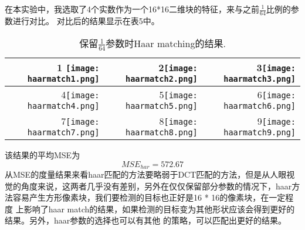 \documentclass{ctexart}
\begin{document}
在本实验中，我选取了4个实数作为一个16*16二维块的特征，来与之前$\frac{1}{64}$比例的参数进行对比。
对比后的结果显示在表5中。
\begin{table}
\Large 
\begin{tabular}{|r|r|r|}
\hline

1 \texttt{[image: haarmatch1.png]} & 2\texttt{[image: haarmatch2.png]} & 3\texttt{[image: haarmatch3.png]} \\ \hline

4\texttt{[image: haarmatch4.png]} & 5\texttt{[image: haarmatch5.png]} & 6\texttt{[image: haarmatch6.png]} \\ \hline

7\texttt{[image: haarmatch7.png]} & 8\texttt{[image: haarmatch8.png]} & 9\texttt{[image: haarmatch9.png]} \\ \hline

\end{tabular}
\caption{保留$\frac{1}{64}$参数时Haar matching的结果.}
\end{table}
该结果的平均MSE为
\begin{equation}
MSE_{har} = 572.67
\end{equation}
从MSE的度量结果来看haar匹配的方法要略弱于DCT匹配的方法，但是从人眼视觉的角度来说，这两者几乎没有差别，另外在仅仅保留部分参数的情况下，haar方法容易产生方形像素块，我们要检测的目标也正好是16 * 16的像素块，在一定程度
上影响了haar match的结果，如果检测的目标变为其他形状应该会得到更好的结果。另外，haar参数的选择也可以有其他
的策略，可以匹配出更好的结果。
\end{document}
